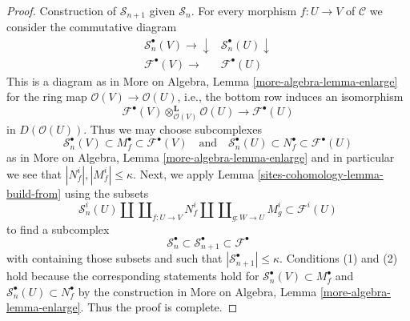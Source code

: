 \begin{proof}
\medskip\noindent
Construction of $\mathcal{S}_{n + 1}$ given $\mathcal{S}_n$.
For every morphism $f : U \to V$ of $\mathcal{C}$
we consider the commutative diagram
$$
\begin{array}{cc}\mathcal{S}_n^\bullet(V)
\longrightarrow\downarrow & \mathcal{S}_n^\bullet(U) \downarrow \\ \mathcal{F}^\bullet(V)
\longrightarrow & \mathcal{F}^\bullet(U)\end{array}
$$
This is a diagram as in More on Algebra, Lemma \ref{more-algebra-lemma-enlarge}
for the ring map $\mathcal{O}(V) \to \mathcal{O}(U)$, i.e., the bottom row
induces an isomorphism
$$
\mathcal{F}^\bullet(V) \otimes_{\mathcal{O}(V)}^\mathbf{L} \mathcal{O}(U)
\longrightarrow
\mathcal{F}^\bullet(U)
$$
in $D(\mathcal{O}(U))$. Thus we may choose subcomplexes
$$
\mathcal{S}_n^\bullet(V) \subset M^\bullet_f \subset \mathcal{F}^\bullet(V)
\quad\text{and}\quad
\mathcal{S}_n^\bullet(U) \subset N^\bullet_f \subset \mathcal{F}^\bullet(U)
$$
as in More on Algebra, Lemma \ref{more-algebra-lemma-enlarge}
and in particular we see that $|N^i_f|, |M^i_f| \leq \kappa$. Next, we apply
Lemma \ref{sites-cohomology-lemma-build-from} using the subsets
$$
\mathcal{S}_n^i(U) \amalg \coprod\nolimits_{f : U \to V} N^i_f
\amalg \coprod\nolimits_{g : W \to U} M^i_g
\subset
\mathcal{F}^i(U)
$$
to find a subcomplex
$$
\mathcal{S}_n^\bullet \subset
\mathcal{S}_{n + 1}^\bullet \subset
\mathcal{F}^\bullet
$$
with containing those subsets and such that
$|\mathcal{S}_{n + 1}^\bullet| \leq \kappa$.
Conditions (1) and (2) hold because the corresponding statements
hold for
$\mathcal{S}_n^\bullet(V) \subset M^\bullet_f$ and
$\mathcal{S}_n^\bullet(U) \subset N^\bullet_f$ by the construction in
More on Algebra, Lemma \ref{more-algebra-lemma-enlarge}.
Thus the proof is complete.
\end{proof}

